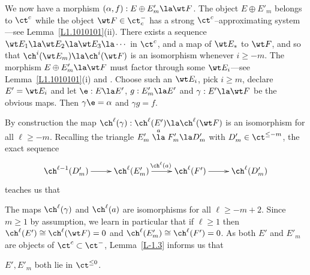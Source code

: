 \documentclass[11pt]{amsart}
\begin{document}
We now have a morphism $(\alpha,f):E\oplus E'_m\la \wt F$.
The object $E\oplus E'_m$ belongs to $\ct^c$ while
the object $\wt F\in\ct^-_c$ has a strong $\ct^c$--approximating
system---see Lemma~\ref{L1.1010101}(ii). There exists a sequence
$\wt E_1\la \wt E_2\la\wt E_3\la\cdots$ in $\ct^c$,
and a map of $\wt E_*$ to $\wt F$, and so that
$\ch^i(\wt E_m)\la\ch^i(\wt F)$ is an isomorphism whenever
$i\geq-m$.
The morphism $E\oplus E'_m\la \wt F$ must factor
through some $\wt E_i$---see Lemma~\ref{L1.1010101}(i) and
\cite[Lemma~2.8]{Neeman96}.
Choose such an $\wt E_i$, pick  $i\geq m$, declare $E'=\wt E_i$ and
let $\e:E\la E'$, $g:E'_m\la E'$ and $\gamma:E'\la \wt F$ be
the obvious maps. Then $\gamma\e=\alpha$ and $\gamma g=f$.

By construction the map $\ch^\ell(\gamma):\ch^\ell(E')\la\ch^\ell(\wt F)$ is an
isomorphism for all $\ell\geq-m$.
Recalling 
the triangle $E'_m\stackrel a\la F'_m\la D'_m$ with 
$D'_m\in\ct^{\leq-m}$, the exact sequence
\[\xymatrix@R-20pt{
\ch^{\ell-1}(D'_m)\ar[r]  & \ch^\ell(E'_m)\ar[r]^{\ch^\ell(a)} &
\ch^\ell(F')\ar[r] & \ch^\ell(D'_m)
}\]
teaches us that
\be
\setcounter{enumi}{\value{enumiv}}
\item
The maps $\ch^\ell(\gamma)$ and $\ch^\ell(a)$
are isomorphisms for all $\ell\geq-m+2$.
\setcounter{enumiv}{\value{enumi}}
\ee
Since $m\geq1$ by
assumption, we learn in particular that
if $\ell\geq1$ then $\ch^\ell(E')\cong\ch^\ell(\wt F)=0$
and $\ch^\ell(E'_m)\cong\ch^\ell(F')=0$. As both
$E'$ and $E'_m$ are objects of $\ct^c\subset\ct^-$,
Lemma~\ref{L-1.3} informs us that
\be
\setcounter{enumi}{\value{enumiv}}
\item
$E',E'_m$ both
lie in $\ct^{\leq0}$.
\setcounter{enumiv}{\value{enumi}}
\ee
\end{document}
